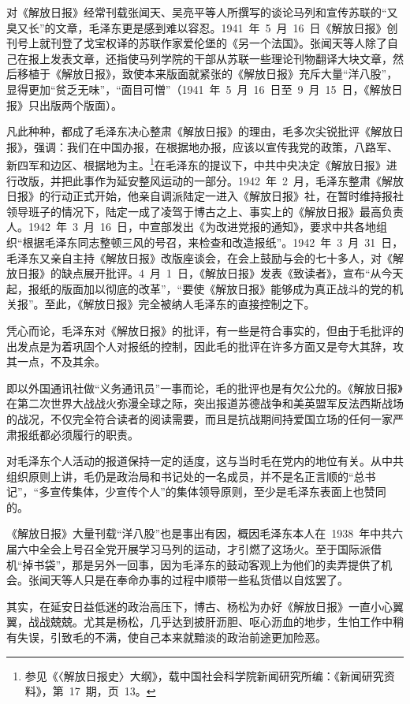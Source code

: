 对《解放日报》经常刊载张闻天、吴亮平等人所撰写的谈论马列和宣传苏联的“又臭又长”的文章，毛泽东更是感到难以容忍。1941~年~5~月~16~日《解放日报》创刊号上就刊登了戈宝权译的苏联作家爱伦堡的《另一个法国》。张闻天等人除了自己在报上发表文章，还指使马列学院的干部从苏联一些理论刊物翻译大块文章，然后移植于《解放日报》，致使本来版面就紧张的《解放日报》充斥大量“洋八股”，显得更加“贫乏无味”，“面目可憎”（1941~年~5~月~16~日至~9~月~15~日，《解放日报》只出版两个版面）。

凡此种种，都成了毛泽东决心整肃《解放日报》的理由，毛多次尖锐批评《解放日报》，强调：我们在中国办报，在根据地办报，应该以宣传我党的政策，八路军、新四军和边区、根据地为主。\footnote{参见《〈解放日报史〉大纲》，载中国社会科学院新闻研究所编：《新闻研究资料》，第~17~期，页~13。}在毛泽东的提议下，中共中央决定《解放日报》进行改版，并把此事作为延安整风运动的一部分。1942~年~2~月，毛泽东整肃《解放日报》的行动正式开始，他亲自调派陆定一进入《解放日报》社，在暂时维持报社领导班子的情况下，陆定一成了凌驾于博古之上、事实上的《解放日报》最高负责人。1942~年~3~月~16~日，中宣部发出《为改进党报的通知》，要求中共各地组织“根据毛泽东同志整顿三风的号召，来检查和改造报纸”。1942~年~3~月~31~日，毛泽东又亲自主持《解放日报》改版座谈会，在会上鼓励与会的七十多人，对《解放日报》的缺点展开批评。4~月~1~日，《解放日报》发表《致读者》，宣布“从今天起，报纸的版面加以彻底的改革”，“要使《解放日报》能够成为真正战斗的党的机关报”。至此，《解放日报》完全被纳人毛泽东的直接控制之下。

凭心而论，毛泽东对《解放日报》的批评，有一些是符合事实的，但由于毛批评的出发点是为着巩固个人对报纸的控制，因此毛的批评在许多方面又是夸大其辞，攻其一点，不及其余。

即以外国通讯社做“义务通讯员”一事而论，毛的批评也是有欠公允的。《解放日报》在第二次世界大战战火弥漫全球之际，突出报道苏德战争和美英盟军反法西斯战场的战况，不仅完全符合读者的阅读需要，而且是抗战期间持爱国立场的任何一家严肃报纸都必须履行的职责。

对毛泽东个人活动的报道保持一定的适度，这与当时毛在党内的地位有关。从中共组织原则上讲，毛仍是政治局和书记处的一名成员，并不是名正言顺的“总书记”，“多宣传集体，少宣传个人”的集体领导原则，至少是毛泽东表面上也赞同的。

《解放日报》大量刊载“洋八股”也是事出有因，概因毛泽东本人在~1938~年中共六届六中全会上号召全党开展学习马列的运动，才引燃了这场火。至于国际派借机“掉书袋”，那是另外一回事，因为毛泽东的鼓动客观上为他们的卖弄提供了机会。张闻天等人只是在奉命办事的过程中顺带一些私货借以自炫罢了。

其实，在延安日益低迷的政治高压下，博古、杨松为办好《解放日报》一直小心翼翼，战战兢兢。尤其是杨松，几乎达到披肝沥胆、呕心沥血的地步，生怕工作中稍有失误，引致毛的不满，使自己本来就黯淡的政治前途更加险恶。

